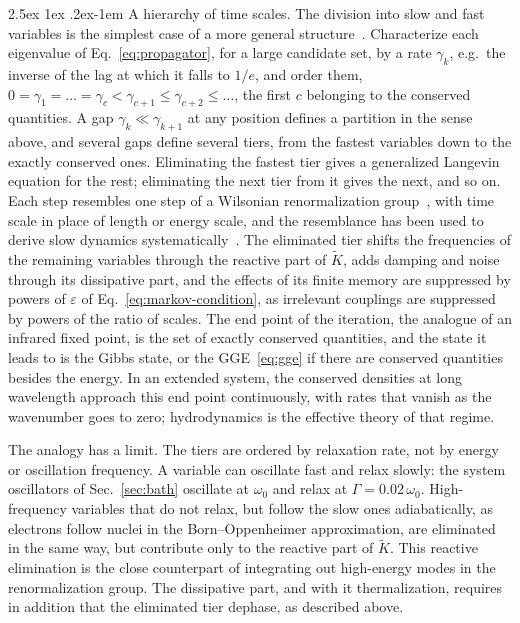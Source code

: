 \documentclass[10pt,a4paper]{article}
\makeatletter
\renewcommand{\paragraph}{\@startsection{paragraph}{4}{\z@}%
  {2.5ex \@plus 1ex \@minus .2ex}{-1em}%
  {\normalfont\fontsize{14pt}{17pt}\selectfont\bfseries}}
\makeatother
\begin{document}
\paragraph{A hierarchy of time scales.}
The division into slow and fast variables is the simplest case of a more general structure~\cite{Bogoliubov1946}.
Characterize each eigenvalue of Eq.~\eqref{eq:propagator}, for a large candidate set, by a rate $ \gamma_k $, e.g.\ the inverse of the lag at which it falls to $ 1/e $, and order them, $ 0 = \gamma_1 = \dots = \gamma_c < \gamma_{c+1} \le \gamma_{c+2} \le \dots $, the first $ c $ belonging to the conserved quantities.
A gap $ \gamma_k \ll \gamma_{k+1} $ at any position defines a partition in the sense above, and several gaps define several tiers, from the fastest variables down to the exactly conserved ones.
Eliminating the fastest tier gives a generalized Langevin equation for the rest; eliminating the next tier from it gives the next, and so on.
Each step resembles one step of a Wilsonian renormalization group~\cite{WilsonKogut1974}, with time scale in place of length or energy scale, and the resemblance has been used to derive slow dynamics systematically~\cite{Chen1996}.
The eliminated tier shifts the frequencies of the remaining variables through the reactive part of $ \tilde K $, adds damping and noise through its dissipative part, and the effects of its finite memory are suppressed by powers of $ \varepsilon $ of Eq.~\eqref{eq:markov-condition}, as irrelevant couplings are suppressed by powers of the ratio of scales.
The end point of the iteration, the analogue of an infrared fixed point, is the set of exactly conserved quantities, and the state it leads to is the Gibbs state, or the GGE~\eqref{eq:gge} if there are conserved quantities besides the energy.
In an extended system, the conserved densities at long wavelength approach this end point continuously, with rates that vanish as the wavenumber goes to zero; hydrodynamics is the effective theory of that regime.

The analogy has a limit.
The tiers are ordered by relaxation rate, not by energy or oscillation frequency.
A variable can oscillate fast and relax slowly: the system oscillators of Sec.~\ref{sec:bath} oscillate at $ \omega_0 $ and relax at $ \Gamma = 0.02\,\omega_0 $.
High-frequency variables that do not relax, but follow the slow ones adiabatically, as electrons follow nuclei in the Born--Oppenheimer approximation, are eliminated in the same way, but contribute only to the reactive part of $ \tilde K $.
This reactive elimination is the close counterpart of integrating out high-energy modes in the renormalization group.
The dissipative part, and with it thermalization, requires in addition that the eliminated tier dephase, as described above.
\end{document}
